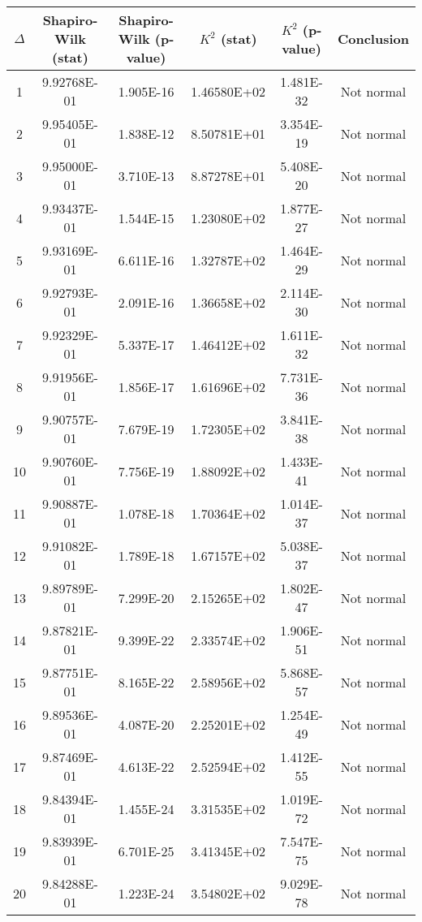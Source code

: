 \begin{table}[h]
	\begin{tabular}{|c|c|c|c|c|c|}
		\hline
		$\Delta$ &  Shapiro-Wilk (stat) & Shapiro-Wilk (p-value) & $K^2$ (stat) & $K^2$ (p-value) & Conclusion\\\hline
		\hline
		1 & 9.92768E-01 & 1.905E-16 & 1.46580E+02 & 1.481E-32 & Not normal\\\hline
		2 & 9.95405E-01 & 1.838E-12 & 8.50781E+01 & 3.354E-19 & Not normal\\\hline
		3 & 9.95000E-01 & 3.710E-13 & 8.87278E+01 & 5.408E-20 & Not normal\\\hline
		4 & 9.93437E-01 & 1.544E-15 & 1.23080E+02 & 1.877E-27 & Not normal\\\hline
		5 & 9.93169E-01 & 6.611E-16 & 1.32787E+02 & 1.464E-29 & Not normal\\\hline
		6 & 9.92793E-01 & 2.091E-16 & 1.36658E+02 & 2.114E-30 & Not normal\\\hline
		7 & 9.92329E-01 & 5.337E-17 & 1.46412E+02 & 1.611E-32 & Not normal\\\hline
		8 & 9.91956E-01 & 1.856E-17 & 1.61696E+02 & 7.731E-36 & Not normal\\\hline
		9 & 9.90757E-01 & 7.679E-19 & 1.72305E+02 & 3.841E-38 & Not normal\\\hline
		10 & 9.90760E-01 & 7.756E-19 & 1.88092E+02 & 1.433E-41 & Not normal\\\hline
		11 & 9.90887E-01 & 1.078E-18 & 1.70364E+02 & 1.014E-37 & Not normal\\\hline
		12 & 9.91082E-01 & 1.789E-18 & 1.67157E+02 & 5.038E-37 & Not normal\\\hline
		13 & 9.89789E-01 & 7.299E-20 & 2.15265E+02 & 1.802E-47 & Not normal\\\hline
		14 & 9.87821E-01 & 9.399E-22 & 2.33574E+02 & 1.906E-51 & Not normal\\\hline
		15 & 9.87751E-01 & 8.165E-22 & 2.58956E+02 & 5.868E-57 & Not normal\\\hline
		16 & 9.89536E-01 & 4.087E-20 & 2.25201E+02 & 1.254E-49 & Not normal\\\hline
		17 & 9.87469E-01 & 4.613E-22 & 2.52594E+02 & 1.412E-55 & Not normal\\\hline
		18 & 9.84394E-01 & 1.455E-24 & 3.31535E+02 & 1.019E-72 & Not normal\\\hline
		19 & 9.83939E-01 & 6.701E-25 & 3.41345E+02 & 7.547E-75 & Not normal\\\hline
		20 & 9.84288E-01 & 1.223E-24 & 3.54802E+02 & 9.029E-78 & Not normal\\\hline

\end{tabular}
\end{table}
